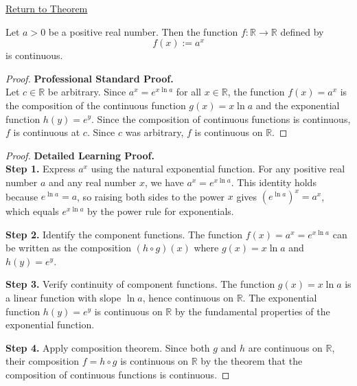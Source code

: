 \newpage
{}
\label{prf:exponentiation-continuous-base}

\begin{remark*}[Return]
\hyperref[thm:exponentiation-continuous-base]{Return to Theorem}
\end{remark*}

\begin{theorem*}
Let $a > 0$ be a positive real number. Then the function $f \colon \mathbb{R} \to \mathbb{R}$ defined by
\[
f(x) := a^x
\]
is continuous.
\end{theorem*}

\begin{proof}
\textbf{Professional Standard Proof.}~\\
Let $c \in \mathbb{R}$ be arbitrary. Since $a^x = e^{x \ln a}$ for all $x \in \mathbb{R}$, the function $f(x) = a^x$ is the composition of the continuous function $g(x) = x \ln a$ and the exponential function $h(y) = e^y$. Since the composition of continuous functions is continuous, $f$ is continuous at $c$. Since $c$ was arbitrary, $f$ is continuous on $\mathbb{R}$.
\end{proof}

\begin{proof}
\textbf{Detailed Learning Proof.}~\\

\textbf{Step 1.} Express $a^x$ using the natural exponential function. For any positive real number $a$ and any real number $x$, we have $a^x = e^{x \ln a}$. This identity holds because $e^{\ln a} = a$, so raising both sides to the power $x$ gives $(e^{\ln a})^x = a^x$, which equals $e^{x \ln a}$ by the power rule for exponentials.

\textbf{Step 2.} Identify the component functions. The function $f(x) = a^x = e^{x \ln a}$ can be written as the composition $(h \circ g)(x)$ where $g(x) = x \ln a$ and $h(y) = e^y$.

\textbf{Step 3.} Verify continuity of component functions. The function $g(x) = x \ln a$ is a linear function with slope $\ln a$, hence continuous on $\mathbb{R}$. The exponential function $h(y) = e^y$ is continuous on $\mathbb{R}$ by the fundamental properties of the exponential function.

\textbf{Step 4.} Apply composition theorem. Since both $g$ and $h$ are continuous on $\mathbb{R}$, their composition $f = h \circ g$ is continuous on $\mathbb{R}$ by the theorem that the composition of continuous functions is continuous.
\end{proof}

